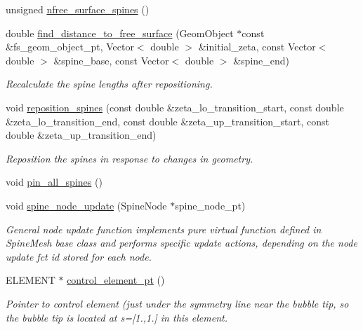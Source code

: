 \begin{DoxyCompactItemize}
unsigned \hyperlink{classoomph_1_1BrethertonSpineMesh_ade4d0f2933beddda517b949d80928a18}{nfree\+\_\+surface\+\_\+spines} ()
\item 
double \hyperlink{classoomph_1_1BrethertonSpineMesh_ac80488ae4db2da00e1b38f6f07e0ff9d}{find\+\_\+distance\+\_\+to\+\_\+free\+\_\+surface} (Geom\+Object $\ast$const \&fs\+\_\+geom\+\_\+object\+\_\+pt, Vector$<$ double $>$ \&initial\+\_\+zeta, const Vector$<$ double $>$ \&spine\+\_\+base, const Vector$<$ double $>$ \&spine\+\_\+end)
\begin{DoxyCompactList}\small\item\em Recalculate the spine lengths after repositioning. \end{DoxyCompactList}\item 
void \hyperlink{classoomph_1_1BrethertonSpineMesh_a0dfeac5bc9a4fa4bfdcd443def30dcdb}{reposition\+\_\+spines} (const double \&zeta\+\_\+lo\+\_\+transition\+\_\+start, const double \&zeta\+\_\+lo\+\_\+transition\+\_\+end, const double \&zeta\+\_\+up\+\_\+transition\+\_\+start, const double \&zeta\+\_\+up\+\_\+transition\+\_\+end)
\begin{DoxyCompactList}\small\item\em Reposition the spines in response to changes in geometry. \end{DoxyCompactList}\item 
void \hyperlink{classoomph_1_1BrethertonSpineMesh_a507ea97977b837f2f0d9647407d770cd}{pin\+\_\+all\+\_\+spines} ()
\item 
void \hyperlink{classoomph_1_1BrethertonSpineMesh_a981301706d4940cfb24d3d769a7a523b}{spine\+\_\+node\+\_\+update} (Spine\+Node $\ast$spine\+\_\+node\+\_\+pt)
\begin{DoxyCompactList}\small\item\em General node update function implements pure virtual function defined in Spine\+Mesh base class and performs specific update actions, depending on the node update fct id stored for each node. \end{DoxyCompactList}\item 
E\+L\+E\+M\+E\+NT $\ast$ \hyperlink{classoomph_1_1BrethertonSpineMesh_a9b02893724c76098f75d9285e9985f4b}{control\+\_\+element\+\_\+pt} ()
\begin{DoxyCompactList}\small\item\em Pointer to control element (just under the symmetry line near the bubble tip, so the bubble tip is located at s=\mbox{[}1.,1.\mbox{]} in this element. \end{DoxyCompactList}\item 

\end{DoxyCompactItemize}
